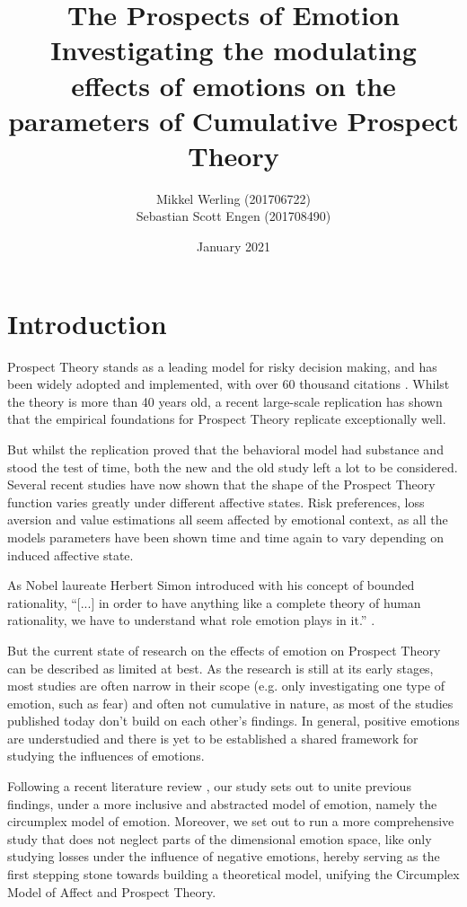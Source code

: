 \documentclass{article}
\title{The Prospects of Emotion \\
\large Investigating the modulating effects of emotions on the parameters of Cumulative Prospect Theory
}
\author{Mikkel Werling (201706722) \\ Sebastian Scott Engen (201708490)}
\date{January 2021}
\begin{document}
    \maketitle
    \tableofcontents
    \section{Introduction}
    Prospect Theory stands as a leading model for risky decision making, and has been widely adopted \cite{barberis2013jep} and implemented, with over 60 thousand citations \cite{kahneman1979e}. Whilst the theory is more than 40 years old, a recent large-scale replication \cite{kim2020sr} has shown that the empirical foundations for Prospect Theory replicate exceptionally well.

But whilst the replication proved that the behavioral model had substance and stood the test of time, both the new and the old study left a lot to be considered. Several recent studies \cite{cahlikova2017ee,campos2014role} have now shown that the shape of the Prospect Theory function varies greatly under different affective states. Risk preferences, loss aversion and value estimations all seem affected by emotional context, as all the models parameters have been shown time and time again to vary depending on induced affective state.

As Nobel laureate Herbert Simon introduced with his concept of  bounded rationality, “[...] in order to have anything like a complete theory of human rationality, we have to understand what role emotion plays in it.” \cite{simon1967pr}.

But the current state of research on the effects of emotion on Prospect Theory can be described as limited at best. As the research is still at its early stages, most studies are often narrow in their scope (e.g. only investigating one type of emotion, such as fear) and often not cumulative in nature, as most of the studies published today don’t build on each other's findings. 
In general, positive emotions are understudied and there is yet to be established a shared framework for studying the influences of emotions. 

Following a recent literature review \cite{prietzel2020mrq}, our study sets out to unite previous findings, under a more inclusive and abstracted model of emotion, namely the circumplex model of emotion. Moreover, we set out to run a more comprehensive study that does not neglect parts of the dimensional emotion space, like only studying losses under the influence of negative emotions, hereby serving as the first stepping stone towards building a theoretical model, unifying the Circumplex Model of Affect and Prospect Theory.
\end{document}
